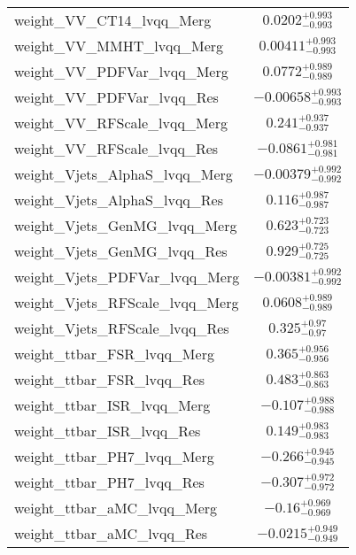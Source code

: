 \begin{tabular}{|l|c|}
weight\_VV\_CT14\_lvqq\_Merg & $0.0202^{+0.993}_{-0.993}$ \\
weight\_VV\_MMHT\_lvqq\_Merg & $0.00411^{+0.993}_{-0.993}$ \\
weight\_VV\_PDFVar\_lvqq\_Merg & $0.0772^{+0.989}_{-0.989}$ \\
weight\_VV\_PDFVar\_lvqq\_Res & $-0.00658^{+0.993}_{-0.993}$ \\
weight\_VV\_RFScale\_lvqq\_Merg & $0.241^{+0.937}_{-0.937}$ \\
weight\_VV\_RFScale\_lvqq\_Res & $-0.0861^{+0.981}_{-0.981}$ \\
weight\_Vjets\_AlphaS\_lvqq\_Merg & $-0.00379^{+0.992}_{-0.992}$ \\
weight\_Vjets\_AlphaS\_lvqq\_Res & $0.116^{+0.987}_{-0.987}$ \\
weight\_Vjets\_GenMG\_lvqq\_Merg & $0.623^{+0.723}_{-0.723}$ \\
weight\_Vjets\_GenMG\_lvqq\_Res & $0.929^{+0.725}_{-0.725}$ \\
weight\_Vjets\_PDFVar\_lvqq\_Merg & $-0.00381^{+0.992}_{-0.992}$ \\
weight\_Vjets\_RFScale\_lvqq\_Merg & $0.0608^{+0.989}_{-0.989}$ \\
weight\_Vjets\_RFScale\_lvqq\_Res & $0.325^{+0.97}_{-0.97}$ \\
weight\_ttbar\_FSR\_lvqq\_Merg & $0.365^{+0.956}_{-0.956}$ \\
weight\_ttbar\_FSR\_lvqq\_Res & $0.483^{+0.863}_{-0.863}$ \\
weight\_ttbar\_ISR\_lvqq\_Merg & $-0.107^{+0.988}_{-0.988}$ \\
weight\_ttbar\_ISR\_lvqq\_Res & $0.149^{+0.983}_{-0.983}$ \\
weight\_ttbar\_PH7\_lvqq\_Merg & $-0.266^{+0.945}_{-0.945}$ \\
weight\_ttbar\_PH7\_lvqq\_Res & $-0.307^{+0.972}_{-0.972}$ \\
weight\_ttbar\_aMC\_lvqq\_Merg & $-0.16^{+0.969}_{-0.969}$ \\
weight\_ttbar\_aMC\_lvqq\_Res & $-0.0215^{+0.949}_{-0.949}$ \\
\hline
\end{tabular}
